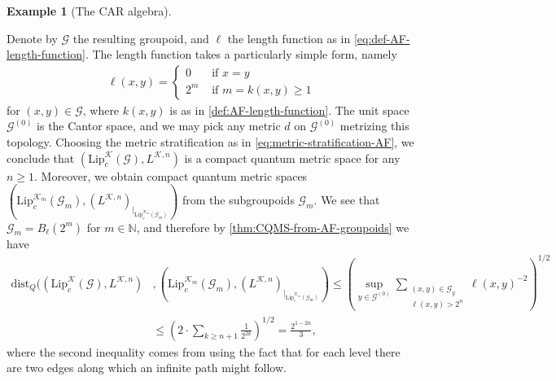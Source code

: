 \documentclass[11pt,a4paper,oneside,final,reqno]{amsart}
\theoremstyle{definition}
\newtheorem{example}[lemma]{Example}
\newcommand{\G}{\mathcal{G}}
\newcommand{\Go}{\mathcal{G}^{(0)}}
\newcommand{\cK}{\mathcal{K}}
\newcommand{\Lip}{\mathrm{Lip}}
\newcommand{\N}{\mathbb{N}}
\numberwithin{equation}{section}
\begin{document}
\begin{example}[The CAR algebra]
		\vspace{4mm}
		\begin{center}
		\end{center}
		Denote by $\G$ the resulting groupoid, and $\ell$ the length function as in \eqref{eq:def-AF-length-function}.
		The length function takes a particularly simple form, namely
		\begin{align*}
			\ell(x,y) = \begin{cases}
				0 & \text{ if $x=y$} \\
				2^m & \text{ if $m = k(x,y)\geq 1$}
			\end{cases}
		\end{align*}
		for $(x,y) \in \G$, where $k(x,y)$ is as in \cref{def:AF-length-function}. The unit space $\Go$ 
		is the Cantor space,
		and we may pick any metric $d$ on $\Go$ 
		metrizing this topology. 
		Choosing the metric stratification as in \eqref{eq:metric-stratification-AF}, we conclude that 
		$(\Lip_c^{\cK}(\G), L^{\cK, n})$
		is a compact quantum metric space for any $n\geq 1$.  Moreover, we obtain compact quantum metric spaces 
		$(\Lip_c^{\cK_m}(\G_m), (L^{\cK, n})_{\vert_{\Lip_c^{\cK_m}(\G_m)}})$
		from the subgroupoids $\G_m$. We see that $\G_m = B_\ell(2^m)$ for $m \in \N$, and therefore by \cref{thm:CQMS-from-AF-groupoids} we have
		\begin{align*}
			\mathrm{dist}_Q (( \Lip_c^{\cK}(\G), L^{\cK, n})&, (\Lip_c^{\cK_m}(\G_m), (L^{\cK, n})_{\vert_{\Lip_c^{\cK_m}(\G_m)}}) \leq \left( \sup_{y \in \Go} \sum_{\substack{(x,y)\in \G_y \\ \ell(x,y) > 2^n}} \ell(x,y)^{-2} \right)^{1/2} \\ 
			&\leq \left( 2\cdot \sum_{k \geq n+1} \frac{1}{2^{2k}} \right)^{1/2} = \frac{2^{1-2n}}{3},
		\end{align*}
		where the second inequality comes from using the fact that for each level there are two edges along which an infinite path might follow. 
	\end{example}
	
	
		 
	
	\printbibliography
	
\end{document}
